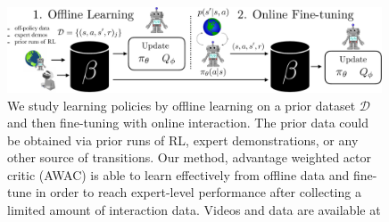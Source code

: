 \setlength{\tabcolsep}{6pt}
\renewcommand{\arraystretch}{1.5}
\begin{figure}[!t]
    \includegraphics[width=0.99\textwidth]{awac/figures/fig1v2-crop.pdf}
    \caption{
    We study learning policies by offline learning on a prior dataset $\mathcal{D}$ and then fine-tuning with online interaction. The prior data could be obtained via prior runs of RL, expert demonstrations, or any other source of transitions. Our method, advantage weighted actor critic (AWAC) is able to learn effectively from offline data and fine-tune in order to reach expert-level performance after collecting a limited amount of interaction data.
    Videos and data are available at \projectpage
    \vspace{-0.3cm}
    }
    \label{fig:figure1}
\end{figure}